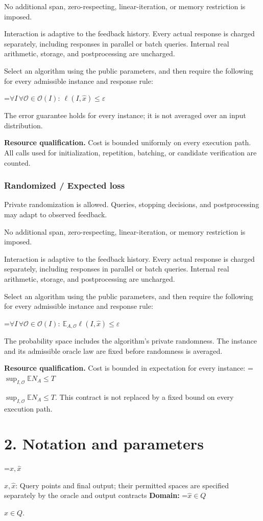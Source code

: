 \documentclass[10pt,a4paper]{article}
\newcommand{\AtlasMath}[1]{\par\begingroup\centering\setbox0=\hbox{$\displaystyle #1$}\ifdim\wd0>1.4\linewidth\typeout{ATLAS WIDE FORMULA: \the\wd0}\fi\ifdim\wd0>\linewidth\resizebox{\linewidth}{!}{\box0}\else\box0\fi\par\endgroup}
\newcommand{\AtlasInlineMath}[1]{\begingroup\setbox0=\hbox{$#1$}\ifdim\wd0>.4\linewidth\endgroup\AtlasMath{#1}\else\endgroup$#1$\fi}
\begin{document}
No additional span, zero-respecting, linear-iteration, or memory restriction is imposed.

Interaction is adaptive to the feedback history. Every actual response is charged separately, including responses in parallel or batch queries. Internal real arithmetic, storage, and postprocessing are uncharged.

Select an algorithm using the public parameters, and then require the following for every admissible instance and response rule:


\AtlasMath{\forall I\,\forall\mathcal{O}\in\mathcal{O}(I):\ \ell(I,\widehat{x})\le\varepsilon}


The error guarantee holds for every instance; it is not averaged over an input distribution.

\textbf{Resource qualification.} Cost is bounded uniformly on every execution path. All calls used for initialization, repetition, batching, or candidate verification are counted.

\subsubsection{Randomized / Expected loss}
Private randomization is allowed. Queries, stopping decisions, and postprocessing may adapt to observed feedback.

No additional span, zero-respecting, linear-iteration, or memory restriction is imposed.

Interaction is adaptive to the feedback history. Every actual response is charged separately, including responses in parallel or batch queries. Internal real arithmetic, storage, and postprocessing are uncharged.

Select an algorithm using the public parameters, and then require the following for every admissible instance and response rule:


\AtlasMath{\forall I\,\forall\mathcal{O}\in\mathcal{O}(I):\ \mathbb{E}_{A,\mathcal{O}}\ell(I,\widehat{x})\le\varepsilon}


The probability space includes the algorithm's private randomness. The instance and its admissible oracle law are fixed before randomness is averaged.

\textbf{Resource qualification.} Cost is bounded in expectation for every instance: \AtlasInlineMath{\sup_{I,\mathcal O}\mathbb E N_A\le T}. This contract is not replaced by a fixed bound on every execution path.

\section{2. Notation and parameters}
\AtlasInlineMath{x,\widehat{x}}: Query points and final output; their permitted spaces are specified separately by the oracle and output contracts \textbf{Domain:} \AtlasInlineMath{\widehat{x}\in Q}.
\end{document}
